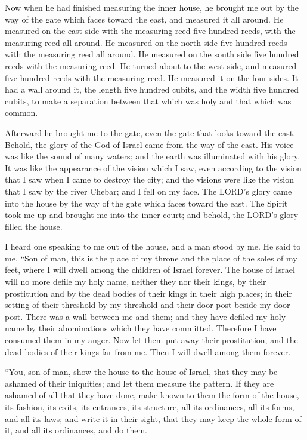\myverse{}Now when he had finished measuring the inner house, he brought
me out by the way of the gate which faces toward the east, and measured it all around.
\myverse{}He measured on the east side with the measuring reed five hundred reeds,
with the measuring reed all around.
\myverse{}He measured on the north side five hundred reeds with the measuring reed
all around.
\myverse{}He measured on the south side five hundred reeds with the measuring reed.
\myverse{}He turned about to the west side, and measured five hundred reeds with the
measuring reed.
\myverse{}He measured it on the four sides. It had a wall around it, the length five
hundred cubits, and the width five hundred cubits, to make a separation between that which was holy and
that which was common.


\mychapter{} \myverse*{}Afterward he brought me to the gate, even the gate that looks
toward the east.
\myverse{}Behold, the glory of the God of Israel came from the way of the east. His voice
was like the sound of many waters; and the earth was illuminated with his glory.
\myverse{}It was like the appearance of the vision which I saw, even according to the
vision that I saw when I came to destroy the city; and the visions were like the vision that I saw by
the river Chebar; and I fell on my face.
\myverse{}The LORD’s glory came into the house by the way of the gate which faces toward
the east.
\myverse{}The Spirit took me up and brought me into the inner court; and behold, the
LORD’s glory filled the house.

\myverse{}I heard one speaking to me out of the house, and a man stood by
me.
\myverse{}He said to me, “Son of man, this is the place of my throne and the place of
the soles of my feet, where I will dwell among the children of Israel forever. The house of Israel will
no more defile my holy name, neither they nor their kings, by their prostitution and by the dead bodies
of their kings in their high places;
\myverse{}in their setting of their threshold by my threshold and their door post beside
my door post. There was a wall between me and them; and they have defiled my holy name by their abominations
which they have committed. Therefore I have consumed them in my anger.
\myverse{}Now let them put away their prostitution, and the dead bodies of their kings
far from me. Then I will dwell among them forever.

\myverse{}“You, son of man, show the house to the house of Israel, that
they may be ashamed of their iniquities; and let them measure the pattern.
\myverse{}If they are ashamed of all that they have done, make known to them the form
of the house, its fashion, its exits, its entrances, its structure, all its ordinances, all its forms,
and all its laws; and write it in their sight, that they may keep the whole form of it, and all its ordinances,
and do them.

